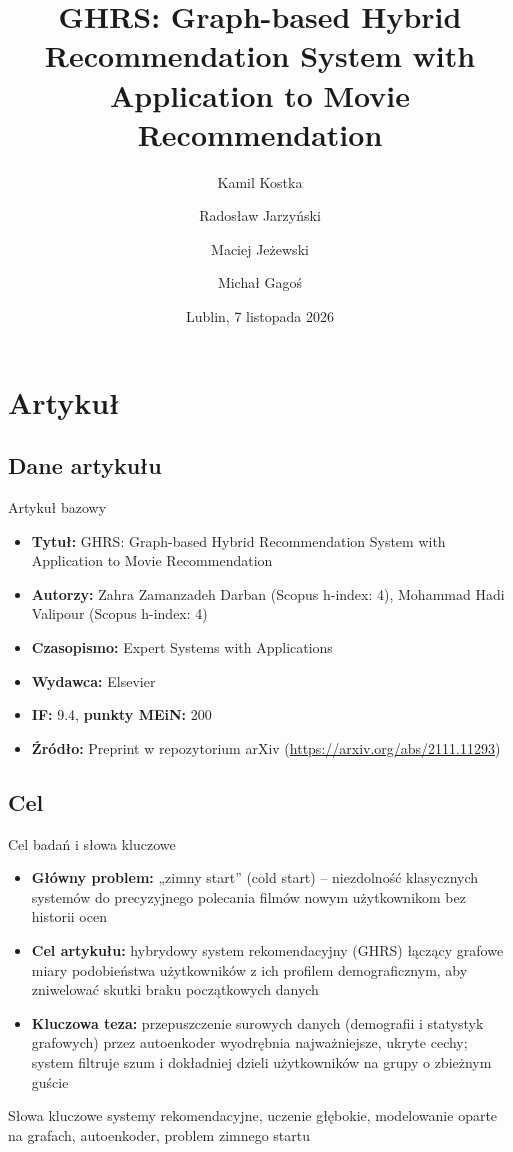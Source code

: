 \documentclass[red]{beamer}
\title{GHRS: Graph-based Hybrid Recommendation System with Application to Movie Recommendation}
\author[ K. Kostka, R Jarzyński, M. Jeżewski, M. Gagoś ]{
    Kamil Kostka \and
    Radosław Jarzyński \and
    Maciej Jeżewski \and
    Michał Gagoś
}
\date{Lublin, 7 listopada 2026}
\begin{document}
    \begin{frame}
    \titlepage
    \end{frame}

    \section{Artykuł}
    \subsection{Dane artykułu}
    \begin{frame}{Artykuł bazowy}
        \begin{itemize}
            \item \textbf{Tytuł:} GHRS: Graph-based Hybrid Recommendation System with Application to Movie Recommendation
            \item \textbf{Autorzy:} Zahra Zamanzadeh Darban (Scopus h-index: 4), Mohammad Hadi Valipour (Scopus h-index: 4)
            \item \textbf{Czasopismo:} Expert Systems with Applications
            \item \textbf{Wydawca:} Elsevier
            \item \textbf{IF:} 9.4, \textbf{punkty MEiN:} 200
            \item \textbf{Źródło:} Preprint w repozytorium arXiv (\url{https://arxiv.org/abs/2111.11293})
        \end{itemize}
    \end{frame}

    \subsection{Cel}
    \begin{frame}{Cel badań i słowa kluczowe}
        \small
        \begin{itemize}
            \item \textbf{Główny problem:} „zimny start” (cold start) -- niezdolność klasycznych systemów do precyzyjnego polecania filmów nowym użytkownikom bez historii ocen
            \item \textbf{Cel artykułu:} hybrydowy system rekomendacyjny (GHRS) łączący grafowe miary podobieństwa użytkowników z ich profilem demograficznym, aby zniwelować skutki braku początkowych danych
            \item \textbf{Kluczowa teza:} przepuszczenie surowych danych (demografii i statystyk grafowych) przez autoenkoder wyodrębnia najważniejsze, ukryte cechy; system filtruje szum i dokładniej dzieli użytkowników na grupy o zbieżnym guście
        \end{itemize}
        \begin{block}{Słowa kluczowe}
        systemy rekomendacyjne, uczenie głębokie, modelowanie oparte na grafach, autoenkoder, problem zimnego startu
        \end{block}
    \end{frame}
\end{document}
